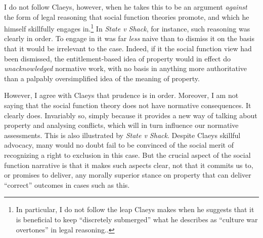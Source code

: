 I do not follow Claeys, however, when he takes this to be an argument {\it against} the form of legal reasoning that social function theories promote, and which he himself skillfully engages in.\footnote{In particular, I do not follow the leap Claeys makes when he suggests that it is beneficial to keep ``discretely submerged'' what he describes as ``culture war overtones'' in legal reasoning.\cite[947]{claeys09}.} In {\it State v Shack}, for instance, such reasoning was clearly in order. To engage in it was far {\it less} naive than to dismiss it on the basis that it would be irrelevant to the case. Indeed, if it the social function view had been dismissed, the entitlement-based idea of property would in effect do {\it unacknowledged} normative work, with no basis in anything more authoritative than a palpably oversimplified idea of the meaning of property. 

However, I agree with Claeys that prudence is in order. Moreover, I am not saying that the social function theory does not have normative consequences. It clearly does. Invariably so, simply because it provides a new way of talking about property and analysing conflicts, which will in turn influence our normative assessments. This is also illustrated by {\it State v Shack}. Despite Claeys skillful advocacy, many would no doubt fail to be convinced of the social merit of recognizing a right to exclusion in this case. But the crucial aspect of the social function narrative is that it makes such aspects clear, not that it commits us to, or promises to deliver, any morally superior stance on property that can deliver ``correct'' outcomes in cases such as this.

